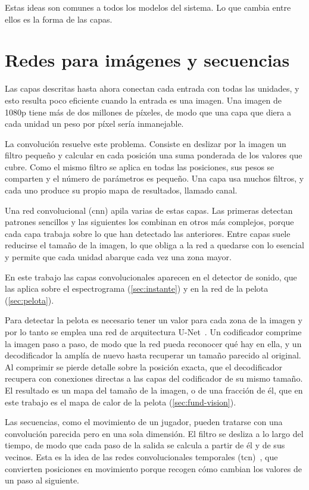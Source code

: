 Estas ideas son comunes a todos los modelos del sistema.
Lo que cambia entre ellos es la forma de las capas.

\section{Redes para imágenes y secuencias}
\label{sec:fund-redes}

Las capas descritas hasta ahora conectan cada entrada con todas las unidades, y esto resulta poco eficiente cuando la entrada es una imagen.
Una imagen de 1080p tiene más de dos millones de píxeles, de modo que una capa que diera a cada unidad un peso por píxel sería inmanejable.

La convolución resuelve este problema.
Consiste en deslizar por la imagen un filtro pequeño y calcular en cada posición una suma ponderada de los valores que cubre.
Como el mismo filtro se aplica en todas las posiciones, sus pesos se comparten y el número de parámetros es pequeño.
Una capa usa muchos filtros, y cada uno produce su propio mapa de resultados, llamado canal.

Una red convolucional (\acs{cnn}) apila varias de estas capas.
Las primeras detectan patrones sencillos y las siguientes los combinan en otros más complejos, porque cada capa trabaja sobre lo que han detectado las anteriores.
Entre capas suele reducirse el tamaño de la imagen, lo que obliga a la red a quedarse con lo esencial y permite que cada unidad abarque cada vez una zona mayor.

En este trabajo las capas convolucionales aparecen en el detector de sonido, que las aplica sobre el espectrograma (\cref{sec:instante}) y en la red de la pelota (\cref{sec:pelota}).

Para detectar la pelota es necesario tener un valor para cada zona de la imagen y por lo tanto se emplea una red de arquitectura U-Net~\cite{ronneberger2015unet}.
Un codificador comprime la imagen paso a paso, de modo que la red pueda reconocer qué hay en ella, y un decodificador la amplía de nuevo hasta recuperar un tamaño parecido al original.
Al comprimir se pierde detalle sobre la posición exacta, que el decodificador recupera con conexiones directas a las capas del codificador de su mismo tamaño.
El resultado es un mapa del tamaño de la imagen, o de una fracción de él, que en este trabajo es el mapa de calor de la pelota (\cref{sec:fund-vision}).

Las secuencias, como el movimiento de un jugador, pueden tratarse con una convolución parecida pero en una sola dimensión.
El filtro se desliza a lo largo del tiempo, de modo que cada paso de la salida se calcula a partir de él y de sus vecinos.
Esta es la idea de las redes convolucionales temporales (\acs{tcn})~\cite{bai2018tcn}, que convierten posiciones en movimiento porque recogen cómo cambian los valores de un paso al siguiente.

